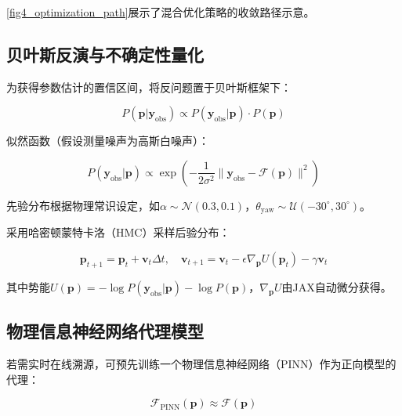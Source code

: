 \documentclass[withoutpreface,bwprint]{cumcmthesis}
\begin{document}
\cref{fig4_optimization_path}展示了混合优化策略的收敛路径示意。


\subsection{贝叶斯反演与不确定性量化}

为获得参数估计的置信区间，将反问题置于贝叶斯框架下：

\begin{equation}
P(\mathbf{p}|\mathbf{y}_{\mathrm{obs}}) \propto P(\mathbf{y}_{\mathrm{obs}}|\mathbf{p})\cdot P(\mathbf{p})
\label{eq:bayesian}
\end{equation}

似然函数（假设测量噪声为高斯白噪声）：

\begin{equation}
P(\mathbf{y}_{\mathrm{obs}}|\mathbf{p}) \propto \exp\left(-\frac{1}{2\sigma^2}\|\mathbf{y}_{\mathrm{obs}}-\mathcal{F}(\mathbf{p})\|^2\right)
\label{eq:likelihood}
\end{equation}

先验分布根据物理常识设定，如$\alpha\sim\mathcal{N}(0.3,0.1)$，$\theta_{\mathrm{yaw}}\sim\mathcal{U}(-30^\circ,30^\circ)$。

采用哈密顿蒙特卡洛（HMC）采样后验分布\cite{neal2011mcmc}：

\begin{equation}
\mathbf{p}_{t+1} = \mathbf{p}_t + \mathbf{v}_t\Delta t,\quad 
\mathbf{v}_{t+1} = \mathbf{v}_t - \epsilon\nabla_{\mathbf{p}}U(\mathbf{p}_t) - \gamma\mathbf{v}_t
\label{eq:hmc}
\end{equation}

其中势能$U(\mathbf{p})=-\log P(\mathbf{y}_{\mathrm{obs}}|\mathbf{p})-\log P(\mathbf{p})$，$\nabla_{\mathbf{p}}U$由JAX自动微分获得。

\subsection{物理信息神经网络代理模型}

若需实时在线溯源，可预先训练一个物理信息神经网络（PINN）作为正向模型的代理\cite{raissi2019physics}：

\begin{equation}
\mathcal{F}_{\mathrm{PINN}}(\mathbf{p}) \approx \mathcal{F}(\mathbf{p})
\label{eq:pinn}
\end{equation}
\end{document}
